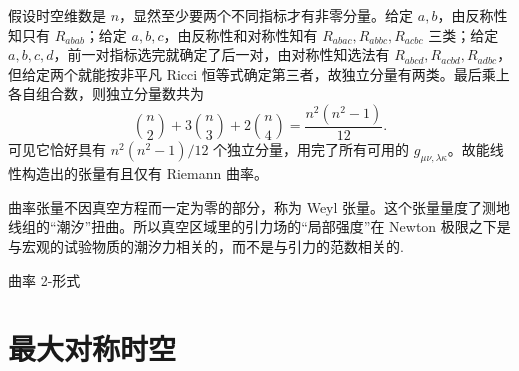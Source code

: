 假设时空维数是 $n$，显然至少要两个不同指标才有非零分量。给定 $a,b$，由反称性知只有 $R_{abab}$；给定 $a,b,c$，由反称性和对称性知有 $R_{abac},R_{abbc},R_{acbc}$ 三类；给定 $a,b,c,d$，前一对指标选完就确定了后一对，由对称性知选法有 $R_{abcd},R_{acbd},R_{adbc}$，但给定两个就能按非平凡 Ricci 恒等式确定第三者，故独立分量有两类。最后乘上各自组合数，则独立分量数共为
\[
    \binom n2+3\binom n3+2\binom n4=\frac{n^2(n^2-1)}{12}.
\]
可见它恰好具有 ${n^2(n^2-1)}/{12}$ 个独立分量，用完了所有可用的 $g_{\mu\nu,\lambda\kappa}$。故能线性构造出的张量有且仅有 Riemann 曲率。

曲率张量不因真空方程而一定为零的部分，称为 Weyl 张量。这个张量量度了测地线组的“潮汐”扭曲。所以真空区域里的引力场的“局部强度”在 Newton 极限之下是与宏观的试验物质的潮汐力相关的，而不是与引力的范数相关的.

曲率 2-形式

\section{最大对称时空}
